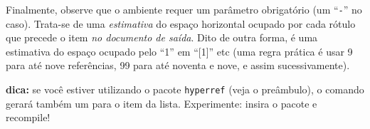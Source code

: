 \documentclass[a4paper,12pt]{article}
\begin{document}

	Finalmente, observe que o ambiente  requer um
parâmetro obrigatório (um ``\texttt{-}\rlap{,}'' no caso). Trata-se de uma
\emph{estimativa} do espaço horizontal ocupado por cada rótulo que precede o
item \emph{no documento de saída}. Dito de outra forma, é uma estimativa do
espaço ocupado pelo ``1'' em ``[1]'' etc (uma regra prática é usar 9 para
até nove referências, 99 para até noventa e nove, e assim sucessivamente).

	\vfill %
	
\noindent\textbf{dica:} se você estiver utilizando o pacote \texttt{hyperref}
(veja o preâmbulo), o comando  gerará também um 
para o item da lista. Experimente: insira o pacote e recompile!
\end{document}
